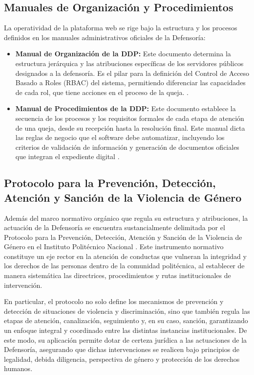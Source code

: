 \subsection{Manuales de Organización y Procedimientos}
La operatividad de la plataforma web se rige bajo la estructura y los procesos definidos en los manuales administrativos oficiales de la Defensoría:
\begin{itemize}
    \item \textbf{Manual de Organización de la DDP:} Este documento determina la estructura jerárquica y las atribuciones específicas de los servidores públicos designados a la defensoría. Es el pilar para la definición del Control de Acceso Basado a Roles (RBAC) del sistema, permitiendo diferenciar las capacidades de cada rol, que tiene acciones en el proceso de la queja. \cite{4} .
    \item \textbf{Manual de Procedimientos de la DDP:} Este documento establece la secuencia de los procesos y los requisitos formales de cada etapa de atención de una queja, desde su recepción hasta la resolución final. Este manual dicta las reglas de negocio que el software debe automatizar, incluyendo los criterios de validación de información y generación de documentos oficiales que integran el expediente digital \cite{5} .
\end{itemize}

\subsection{Protocolo para la Prevención, Detección, Atención y Sanción de la Violencia de Género}
Además del marco normativo orgánico que regula su estructura y atribuciones, la actuación de la Defensoría se encuentra sustancialmente delimitada por el Protocolo para la Prevención, Detección, Atención y Sanción de la Violencia de Género en el Instituto Politécnico Nacional \cite{26}. Este instrumento normativo constituye un eje rector en la atención de conductas que vulneran la integridad y los derechos de las personas dentro de la comunidad politécnica, al establecer de manera sistemática las directrices, procedimientos y rutas institucionales de intervención.

En particular, el protocolo no solo define los mecanismos de prevención y detección de situaciones de violencia y discriminación, sino que también regula las etapas de atención, canalización, seguimiento y, en su caso, sanción, garantizando un enfoque integral y coordinado entre las distintas instancias institucionales. De este modo, su aplicación permite dotar de certeza jurídica a las actuaciones de la Defensoría, asegurando que dichas intervenciones se realicen bajo principios de legalidad, debida diligencia, perspectiva de género y protección de los derechos humanos.

